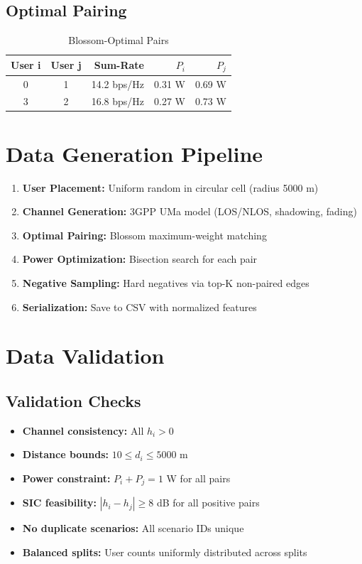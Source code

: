 \subsection{Optimal Pairing}

\begin{table}[H]
\centering
\begin{tabular}{ccrrr}
\toprule
\textbf{User i} & \textbf{User j} & \textbf{Sum-Rate} & \textbf{$P_i$} & \textbf{$P_j$} \\
\midrule
0 & 1 & 14.2 bps/Hz & 0.31 W & 0.69 W \\
3 & 2 & 16.8 bps/Hz & 0.27 W & 0.73 W \\
\bottomrule
\end{tabular}
\caption{Blossom-Optimal Pairs}
\end{table}

\section{Data Generation Pipeline}

\begin{enumerate}
    \item \textbf{User Placement:} Uniform random in circular cell (radius 5000 m)
    \item \textbf{Channel Generation:} 3GPP UMa model (LOS/NLOS, shadowing, fading)
    \item \textbf{Optimal Pairing:} Blossom maximum-weight matching
    \item \textbf{Power Optimization:} Bisection search for each pair
    \item \textbf{Negative Sampling:} Hard negatives via top-K non-paired edges
    \item \textbf{Serialization:} Save to CSV with normalized features
\end{enumerate}

\section{Data Validation}

\subsection{Validation Checks}

\begin{itemize}
    \item \textbf{Channel consistency:} All $h_i > 0$
    \item \textbf{Distance bounds:} $10 \leq d_i \leq 5000$ m
    \item \textbf{Power constraint:} $P_i + P_j = 1$ W for all pairs
    \item \textbf{SIC feasibility:} $|h_i - h_j| \geq 8$ dB for all positive pairs
    \item \textbf{No duplicate scenarios:} All scenario IDs unique
    \item \textbf{Balanced splits:} User counts uniformly distributed across splits
\end{itemize}

